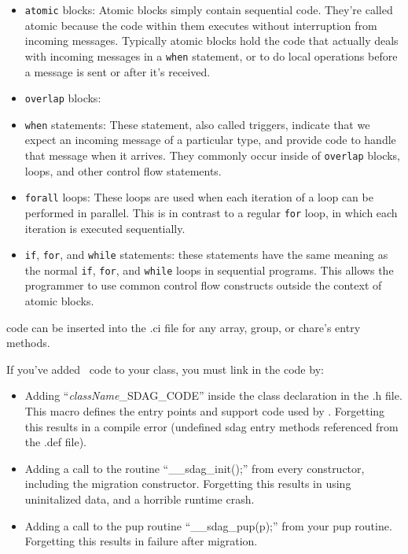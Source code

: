 \begin{itemize}
    \item {\tt atomic} blocks: Atomic blocks simply contain sequential \CC code.
        They're called atomic because the code within them executes without
        interruption from incoming messages. Typically atomic blocks hold the
        code that actually deals with incoming messages in a {\tt when}
        statement, or to do local operations before a message is sent or after
        it's received.
    \item {\tt overlap} blocks: 
    \item {\tt when} statements: These statement, also called triggers, indicate
        that we expect an incoming message of a particular type, and provide
        code to handle that message when it arrives. They commonly occur inside
        of {\tt overlap} blocks, loops, and other control flow statements.
    \item {\tt forall} loops: These loops are used when each iteration of a loop
        can be performed in parallel. This is in contrast to a regular {\tt for}
        loop, in which each iteration is executed sequentially.
    \item {\tt if}, {\tt for}, and {\tt while} statements: these statements have
        the same meaning as the normal {\tt if}, {\tt for}, and {\tt while}
        loops in sequential \CC programs. This allows the programmer to use
        common control flow constructs outside the context of atomic blocks.
\end{itemize}

\sdag{} code can be inserted into the .ci file for any array, group, or chare's entry methods.

If you've added \sdag\ code to your class, you must link in the code by:
\begin{itemize}
  \item Adding ``{\it className}\_SDAG\_CODE'' inside the class declaration
     in the .h file.  This macro defines the entry points and support
     code used by \sdag{}.  Forgetting this results in a compile error
     (undefined sdag entry methods referenced from the .def file).
  \item Adding a call to the routine ``\_\_sdag\_init();'' from every constructor,
     including the migration constructor.  Forgetting this results in
     using uninitalized data, and a horrible runtime crash.
  \item Adding a call to the pup routine ``\_\_sdag\_pup(p);'' from your pup routine.
     Forgetting this results in failure after migration.
\end{itemize}


